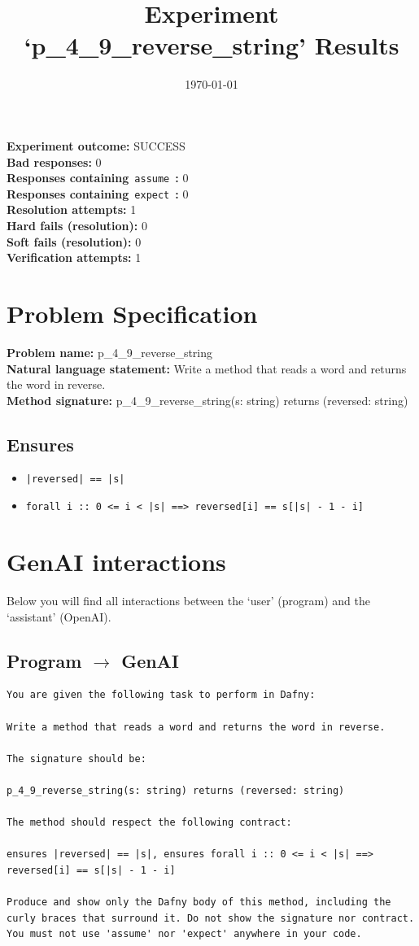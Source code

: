 \documentclass{article}
\begin{document}
\title{Experiment `p\_4\_9\_reverse\_string' Results}
\author{\today}
\date{}
\maketitle
\textbf{Experiment outcome: }SUCCESS
\\\textbf{Bad responses: }0
\\\textbf{Responses containing}~\texttt{assume}~\textbf{: }0
\\\textbf{Responses containing}~\texttt{expect}~\textbf{: }0
\\\textbf{Resolution attempts: }1
\\\textbf{Hard fails (resolution): }0
\\\textbf{Soft fails (resolution): }0
\\\textbf{Verification attempts: }1
\section*{Problem Specification}
\textbf{Problem name: }p\_4\_9\_reverse\_string
\\\textbf{Natural language statement: }Write a method that reads a word and returns the word in reverse.
\\\textbf{Method signature: }p\_4\_9\_reverse\_string(s: string) returns (reversed: string)
\subsection*{Ensures}
\begin{itemize}
\item \texttt{|reversed| == |s|}
\item \texttt{forall i :: 0 <= i < |s| ==> reversed[i] == s[|s| - 1 - i]}
\end{itemize}
\clearpage
\section*{GenAI interactions}
Below you will find all interactions between the `user' (program) and the `assistant' (OpenAI).
\subsection*{Program $\rightarrow$ GenAI}
\begin{lstlisting}
You are given the following task to perform in Dafny:

Write a method that reads a word and returns the word in reverse.

The signature should be:

p_4_9_reverse_string(s: string) returns (reversed: string)

The method should respect the following contract:

ensures |reversed| == |s|, ensures forall i :: 0 <= i < |s| ==> reversed[i] == s[|s| - 1 - i]

Produce and show only the Dafny body of this method, including the curly braces that surround it. Do not show the signature nor contract. You must not use 'assume' nor 'expect' anywhere in your code.
\end{lstlisting}
\end{document}
